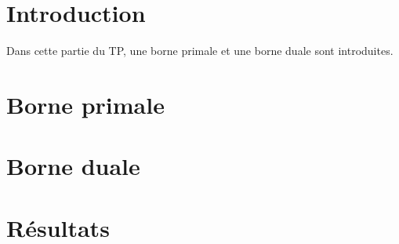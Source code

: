 \section{Introduction}

Dans cette partie du TP, une borne primale et une borne duale sont introduites.

\section{Borne primale}

\section{Borne duale}

\section{Résultats}
